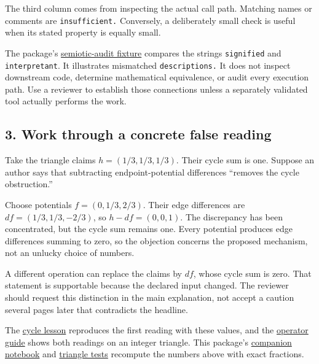 \documentclass[
  11pt,
]{article}
\newcommand{\passthrough}[1]{#1}
\begin{document}
The third column comes from inspecting the actual call path. Matching
names or comments are \nolinkurl{insufficient.} Conversely, a
deliberately small check is useful when its stated property is equally
small.

The package's
\href{code/tests/test_009_adversarial_reality_gate.py}{semiotic-audit
fixture} compares the strings \passthrough{\lstinline!signified!} and
\passthrough{\lstinline!interpretant!}. It illustrates mismatched
\nolinkurl{descriptions.} It does not inspect downstream code, determine
mathematical equivalence, or audit every execution path. Use a reviewer
to establish those connections unless a separately validated tool
actually performs the work.

\subsection{3. Work through a concrete false
reading}\label{work-through-a-concrete-false-reading}

Take the triangle claims \(h=(1/3,\allowbreak 1/3,\allowbreak 1/3)\).
Their cycle sum is one. Suppose an author says that subtracting
endpoint-potential differences ``removes the cycle obstruction.''

Choose potentials \(f=(0,\allowbreak 1/3,\allowbreak 2/3)\). Their edge
differences are \(df=(1/3,\allowbreak 1/3,\allowbreak -2/3)\), so
\(h-df=(0,\allowbreak 0,\allowbreak 1)\). The discrepancy has been
concentrated, but the cycle sum remains one. Every potential produces
edge differences summing to zero, so the objection concerns the proposed
mechanism, not an unlucky choice of numbers.

A different operation can replace the claims by \(df\), whose cycle sum
is zero. That statement is supportable because the declared input
changed. The reviewer should request this distinction in the main
explanation, not accept a caution several pages later that contradicts
the headline.

The
\href{https://github.com/dbccpage/the_symbol_game/blob/52cb5457f6c485ba548cfd292f6012a941ed22cf/omega_engine_education/the_symbol_game/lessons/system_integration/100_novices/04_cycle_repair.ipynb}{cycle
lesson} reproduces the first reading with these values, and the
\href{https://github.com/dbccpage/the_symbol_game/blob/593230f7daba7aa04d7c41dd456dfbd00a39bcbd/omega_engine_atlas/coda_atlas/omega_engine_pfp/005_pfp_practitioners_field_manual/paper.md}{operator
guide} shows both readings on an integer triangle. This package's
\href{jupyter_notebooks/009_triangle_cycle_sum.ipynb}{companion
notebook} and \href{code/tests/test_triangle_cycle_sum.py}{triangle
tests} recompute the numbers above with exact fractions.
\end{document}
